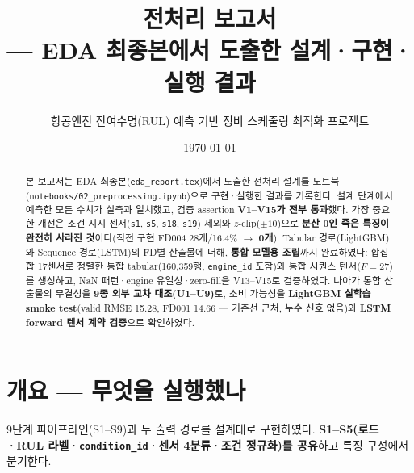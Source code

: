 \documentclass[11pt]{article}
\title{\textbf{전처리 보고서}\\[3pt]
\large — EDA 최종본에서 도출한 설계·구현·실행 결과}
\author{항공엔진 잔여수명(RUL) 예측 기반 정비 스케줄링 최적화 프로젝트}
\date{\today}
\begin{document}
\maketitle

\begin{abstract}
\noindent
본 보고서는 EDA 최종본(\texttt{eda\_report.tex})에서 도출한 전처리 설계를 노트북(\texttt{notebooks/02\_preprocessing.ipynb})으로 구현·실행한 결과를 기록한다.
설계 단계에서 예측한 모든 수치가 실측과 일치했고, 검증 assertion \textbf{V1--V15가 전부 통과}했다.
가장 중요한 개선은 조건 지시 센서(\texttt{s1}, \texttt{s5}, \texttt{s18}, \texttt{s19}) 제외와 $z$-clip($\pm10$)으로
\textbf{분산 0인 죽은 특징이 완전히 사라진 것}이다(직전 구현 FD004 28개/16.4\% $\to$ \textbf{0개}).
Tabular 경로(LightGBM)와 Sequence 경로(LSTM)의 FD별 산출물에 더해, \textbf{통합 모델용 조립}까지 완료하였다:
합집합 17센서로 정렬한 통합 tabular(160{,}359행, \texttt{engine\_id} 포함)와 통합 시퀀스 텐서($F=27$)를 생성하고,
NaN 패턴·engine 유일성·zero-fill을 V13--V15로 검증하였다.
나아가 통합 산출물의 무결성을 \textbf{9종 외부 교차 대조(U1--U9)}로,
소비 가능성을 \textbf{LightGBM 실학습 smoke test}(valid RMSE 15.28, FD001 14.66 — 기준선 근처, 누수 신호 없음)와
\textbf{LSTM forward 텐서 계약 검증}으로 확인하였다.
\end{abstract}
\vspace{0.5em}
\begin{center}\end{center}
\vspace{0.5em}


\tableofcontents
\newpage

\section{개요 — 무엇을 실행했나}

9단계 파이프라인(S1--S9)과 두 출력 경로를 설계대로 구현하였다.
\textbf{S1--S5(로드·RUL 라벨·\texttt{condition\_id}·센서 4분류·조건 정규화)를 공유}하고 특징 구성에서 분기한다.
\end{document}
